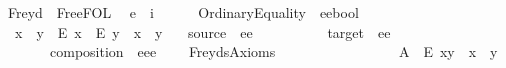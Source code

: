 %
\begin{isabellebody}%
%
%
\isadelimtheory
%
\endisadelimtheory
%
\isatagtheory
{}\isamarkupfalse%
\ Freyd\ \ FreeFOL\ \isanewline
{}%
\endisatagtheory
{\isafoldtheory}%
%
\isadelimtheory
\isanewline
%
\endisadelimtheory
{}\isamarkupfalse%
\ e\ {\isacharequal}\ i\ \ \ %
\ \isanewline
\isanewline
{}\isamarkupfalse%
\ OrdinaryEquality\ {\isacharcolon}{\isacharcolon}\ {\isachardoublequoteopen}e{\isasymRightarrow}e{\isasymRightarrow}bool{\isachardoublequoteclose}\ {\isacharparenleft}\ \isanewline
\ \ {\isachardoublequoteopen}x\ {\isasymapprox}\ y\ {\isasymequiv}\ {\isacharparenleft}{\isacharparenleft}E\ x{\isacharparenright}\ \isactrlbold {\isasymleftrightarrow}\ {\isacharparenleft}E\ y{\isacharparenright}{\isacharparenright}\ \isactrlbold {\isasymand}\ x\ \isactrlbold {\isacharequal}\ y{\isachardoublequoteclose}\ \ \isanewline
\isanewline
{}\isamarkupfalse%
\ source\ {\isacharcolon}{\isacharcolon}\ {\isachardoublequoteopen}e{\isasymRightarrow}e{\isachardoublequoteclose}\ {\isacharparenleft}{\isachardoublequoteopen}{\isasymbox}{\isacharunderscore}{\isachardoublequoteclose}\ {\isacharbrackleft}{}{}{}{\isacharbrackright}{}{}{}{\isacharparenright}\ \isanewline
\ \ \ \ \ \ \ target\ {\isacharcolon}{\isacharcolon}\ {\isachardoublequoteopen}e{\isasymRightarrow}e{\isachardoublequoteclose}\ {\isacharparenleft}{\isachardoublequoteopen}{\isacharunderscore}{\isasymbox}{\isachardoublequoteclose}\ {\isacharbrackleft}{}{}{}{\isacharbrackright}{}{}{}{\isacharparenright}\ \isanewline
\ \ \ \ \ \ \ composition\ {\isacharcolon}{\isacharcolon}\ {\isachardoublequoteopen}e{\isasymRightarrow}e{\isasymRightarrow}e{\isachardoublequoteclose}\ {\isacharparenleft}\ {\isachardoublequoteopen}{\isasymcdot}{\isachardoublequoteclose}\ {}{}{}{\isacharparenright}\isanewline
\isanewline
{}\isamarkupfalse%
\ FreydsAxioms\ \ \ \ \ \ \ \ \ \ \ \ \ \ \ \ \isanewline
\ A{}{\isacharcolon}\ \ {\isachardoublequoteopen}{\isacharparenleft}E\ x{\isasymcdot}y{\isacharparenright}\ \isactrlbold {\isasymleftrightarrow}\ {\isacharparenleft}{\isacharparenleft}x{\isasymbox}{\isacharparenright}\ {\isasymapprox}\ {\isacharparenleft}{\isasymbox}y{\isacharparenright}{\isacharparenright}{\isachardoublequoteclose}\ \isanewline

\end{isabellebody}
